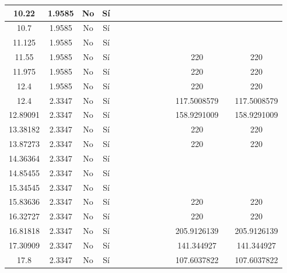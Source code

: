 \begin{table}[H]
{\begin{tabular}{|c|c|c|c|c|c|c|c|c|c|c|c|c|c|}
\hline
10.22 & 1.9585 & No  & Sí  &     &     &     &     &     &     &     &     &     &  \bigstrut\\
\hline
10.7 & 1.9585 & No  & Sí  &     &     &     &     &     &     &     &     &     &  \bigstrut\\
\hline
11.125 & 1.9585 & No  & Sí  &     &     &     &     &     &     &     &     &     &  \bigstrut\\
\hline
11.55 & 1.9585 & No  & Sí  &     &     &     &     &     &     &     & 220 &     & 220 \bigstrut\\
\hline
11.975 & 1.9585 & No  & Sí  &     &     &     &     &     &     &     & 220 &     & 220 \bigstrut\\
\hline
12.4 & 1.9585 & No  & Sí  &     &     &     &     &     &     &     & 220 &     & 220 \bigstrut\\
\hline
12.4 & 2.3347 & No  & Sí  &     &     &     &     &     &     &     & 117.5008579 &     & 117.5008579 \bigstrut\\
\hline
12.89091 & 2.3347 & No  & Sí  &     &     &     &     &     &     &     & 158.9291009 &     & 158.9291009 \bigstrut\\
\hline
13.38182 & 2.3347 & No  & Sí  &     &     &     &     &     &     &     & 220 &     & 220 \bigstrut\\
\hline
13.87273 & 2.3347 & No  & Sí  &     &     &     &     &     &     &     & 220 &     & 220 \bigstrut\\
\hline
14.36364 & 2.3347 & No  & Sí  &     &     &     &     &     &     &     &     &     &  \bigstrut\\
\hline
14.85455 & 2.3347 & No  & Sí  &     &     &     &     &     &     &     &     &     &  \bigstrut\\
\hline
15.34545 & 2.3347 & No  & Sí  &     &     &     &     &     &     &     &     &     &  \bigstrut\\
\hline
15.83636 & 2.3347 & No  & Sí  &     &     &     &     &     &     &     & 220 &     & 220 \bigstrut\\
\hline
16.32727 & 2.3347 & No  & Sí  &     &     &     &     &     &     &     & 220 &     & 220 \bigstrut\\
\hline
16.81818 & 2.3347 & No  & Sí  &     &     &     &     &     &     &     & 205.9126139 &     & 205.9126139 \bigstrut\\
\hline
17.30909 & 2.3347 & No  & Sí  &     &     &     &     &     &     &     & 141.344927 &     & 141.344927 \bigstrut\\
\hline
17.8 & 2.3347 & No  & Sí  &     &     &     &     &     &     &     & 107.6037822 &     & 107.6037822 \bigstrut\\

\end{tabular}}
\end{table}
